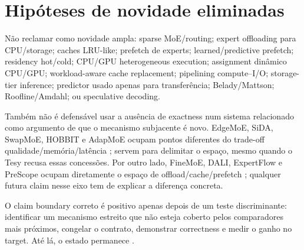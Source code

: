 \section{Hipóteses de novidade eliminadas}
Não reclamar como novidade ampla: sparse MoE/routing; expert offloading para CPU/storage; caches LRU-like; prefetch de experts; learned/predictive prefetch; residency hot/cold; CPU/GPU heterogeneous execution; assignment dinâmico CPU/GPU; workload-aware cache replacement; pipelining compute--I/O; storage-tier inference; predictor usado apenas para transferência; Belady/Mattson; Roofline/Amdahl; ou speculative decoding.

Também não é defensável usar a ausência de exactness num sistema relacionado como argumento de que o mecanismo subjacente é novo. EdgeMoE, SiDA, SwapMoE, HOBBIT e AdapMoE ocupam pontos diferentes do trade-off qualidade/memória/latência \cite{yi2023edgemoe,du2024sida,kong2024swapmoe,tang2024hobbit,zhong2024adapmoe}; servem para delimitar o espaço, mesmo quando o Tesy recusa essas concessões. Por outro lado, FineMoE, DALI, ExpertFlow e PreScope ocupam diretamente o espaço de offload/cache/prefetch \cite{yu2026finemoe,zhu2026dali,he2026expertflow,yu2025prescope}; qualquer futura claim nesse eixo tem de explicar a diferença concreta.

O claim boundary correto é positivo apenas depois de um teste discriminante: identificar um mecanismo estreito que não esteja coberto pelos comparadores mais próximos, congelar o contrato, demonstrar correctness e medir o ganho no target. Até lá, o estado permanece .
